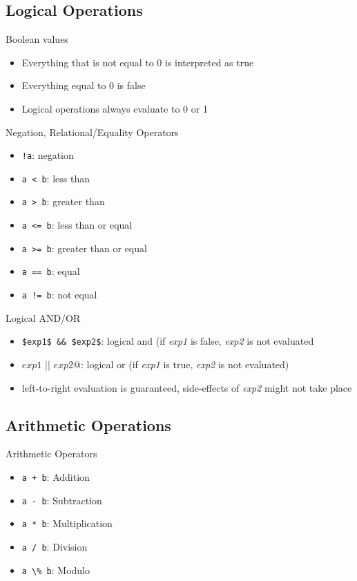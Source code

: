 \documentclass[english,compress]{beamer}
\begin{document}
\subsection{Logical Operations}
\begin{frame}{Boolean values}
	\begin{itemize}
		\item Everything that is not equal to 0 is interpreted as true
		\item Everything equal to 0 is false
		\item Logical operations always evaluate to 0 or 1
	\end{itemize}
\end{frame}

\begin{frame}{Negation, Relational/Equality Operators}
	\begin{itemize}
		\item \lstinline|!a|: negation
		\item \lstinline|a < b|: less than
		\item \lstinline|a > b|: greater than
		\item \lstinline|a <= b|: less than or equal
		\item \lstinline|a >= b|: greater than or equal
		\item \lstinline|a == b|: equal
		\item \lstinline|a != b|: not equal
	\end{itemize}
\end{frame}

\begin{frame}{Logical AND/OR}
	\begin{itemize}
		\item \lstinline|$exp1$ && $exp2$|: logical and (if \textit{exp1} is false, \textit{exp2} is not evaluated
		\item \lstinline@$exp1$ || $exp2$@: logical or (if \textit{exp1} is true, \textit{exp2} is not evaluated)
		\item left-to-right evaluation is guaranteed, side-effects
			of \textit{exp2} might not take place
	\end{itemize}
\end{frame}

\subsection{Arithmetic Operations}
\begin{frame}{Arithmetic Operators}
	\begin{itemize}
		\item \lstinline|a + b|: Addition
		\item \lstinline|a - b|: Subtraction
		\item \lstinline|a * b|: Multiplication
		\item \lstinline|a / b|: Division
		\item \lstinline|a \% b|: Modulo
	\end{itemize}
\end{frame}
\end{document}
